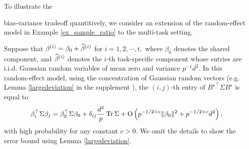 To illustrate the {bias-variance tradeoff quantitively, we consider an extension of the random-effect model in Example \ref{ex_sample_ratio} to the multi-task setting. %


\begin{example}%
\label{ex_same_cov}
Suppose that {$\beta^{(i)}=\beta_0 +\widetilde \beta^{(i)}$} for $ i=1,2,\cdots, t,$
where $\beta_0$ denotes the shared component, %
and $\widetilde \beta^{(i)}$ denotes the $i$-th
task-specific component whose entries are i.i.d. Gaussian random variables of mean zero and variance $p^{-1} d^2$.
In this random-effect model, using the concentration of Gaussian random vectors (e.g. Lemma \ref{largedeviation} in the supplement  \cite{MTL_suppl}),
the $(i, j)$-th entry of ${B^{\star}}^{\top} \Sigma B^{\star}$ is equal to %
\begin{align}\label{betaSbeta}
	\beta_i^{\top}\Sigma  \beta_j =\beta_0^\top \Sigma \beta_0 + \delta_{ij} \frac{d^2 }{p}\tr \Sigma + \OO\left(p^{-1/2+c}\|\beta_0\|^2+ p^{-1/2+c} d^2\right),
\end{align}
 with high probability for any constant $c>0$. We omit the details to show the error bound using Lemma \ref{largedeviation}.

\end{example}}
